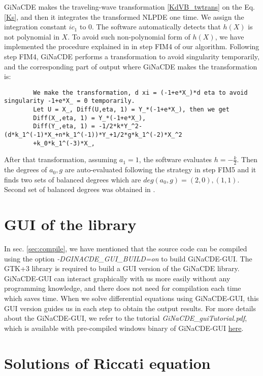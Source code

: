 \documentclass[prd,aps,floats,showkeys,nofootinbib,notitlepage]{revtex4-2}
\begin{document}
	GiNaCDE makes the traveling-wave transformation \eqref{KdVB_twtrans} 
	on the Eq. \eqref{Ks}, and then it integrates the transformed NLPDE one time. We assign the integration constant $ic_1$ to $0$. The software automatically detects that $h(X)$ is not polynomial in $X$. To avoid such non-polynomial form of $h(X)$, we have implemented the procedure explained in \cite{mirza} in step FIM4 of our algorithm. Following step FIM4, GiNaCDE performs a transformation to avoid singularity temporarily, and the corresponding part of output where GiNaCDE makes the transformation is:
	\begin{verbatim}
		We make the transformation, d xi = (-1+e*X_)*d eta to avoid singularity -1+e*X_ = 0 temporarily.
		Let U = X_, Diff(U,eta, 1) = Y_*(-1+e*X_), then we get
		Diff(X_,eta, 1) = Y_*(-1+e*X_),
		Diff(Y_,eta, 1) = -1/2*k*Y_^2-(d*k_1^(-1)*X_+n*k_1^(-1))*Y_+1/2*g*k_1^(-2)*X_^2
		+k_0*k_1^(-3)*X_,
	\end{verbatim}
	After that transformation, assuming $a_1=1$, the software evaluates $h=-\frac{k}{2}$. Then the degrees of $a_0,g$ are auto-evaluated following the strategy in step FIM5 and it finds two sets of balanced degrees which are $deg(a_0,g)=(2,0),(1,1)$. Second set of balanced degrees was obtained in \cite{mirza}.  	
	
	\section{GUI of the library}\label{gui}
	In sec. \ref{sec:compile}, we have mentioned that the source code can be compiled using the option {\em -DGINACDE\_GUI\_BUILD=on} to build GiNaCDE-GUI. The GTK+3 library is required to build a GUI version of the GiNaCDE library. GiNaCDE-GUI can interact graphically with us more easily without any programming knowledge, and there does not need for compilation each time which saves time. When we solve differential equations using GiNaCDE-GUI, this GUI version guides us in each step to obtain the output results. For more details about the GiNaCDE-GUI, we refer to the tutorial \textit{GiNaCDE\_guiTutorial.pdf}, which is available with pre-compiled windows binary of GiNaCDE-GUI \href{https://sourceforge.net/projects/ginacde}{here}.
	
	
	\appendix
	
	\renewcommand{\theequation}{A-\arabic{equation}}
	\section{Solutions of Riccati equation}\label{sec:appenA}
	
\end{document}
